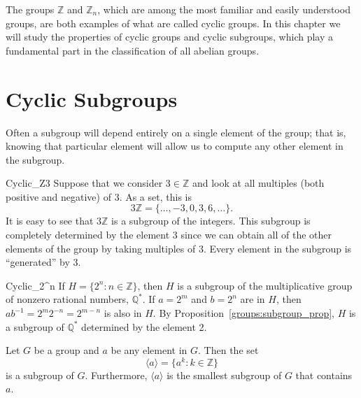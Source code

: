  
The groups $\mathbb Z$ and ${\mathbb Z}_n$, which are among the most familiar and easily understood groups, are both examples of what are called cyclic groups.  In this chapter we will study the properties of cyclic groups and cyclic subgroups, which play a fundamental part in the classification of all abelian groups. 


\section{Cyclic Subgroups}

Often a subgroup will depend entirely on a single element of the group; that is, knowing that particular element will allow us to compute any other element in the subgroup. 

\begin{example}{Cyclic_Z3}
Suppose that we consider $3 \in {\mathbb Z}$ and look at all multiples (both positive and negative) of 3.  As a set, this is 
\[
3 {\mathbb Z} = \{ \ldots, -3, 0, 3, 6, \ldots \}.
\]
It is easy to see that $3 {\mathbb Z}$ is a subgroup of the integers.  This subgroup is completely determined by the element 3 since we can obtain all of the other elements of the group by taking multiples of 3.  Every element in the subgroup is ``generated'' by 3. 
\end{example}

\begin{example}{Cyclic_2^n}
If $H = \{ 2^n : n \in {\mathbb Z} \}$, then $H$ is a subgroup of the multiplicative group of nonzero rational numbers, ${\mathbb Q}^*$.  If $a = 2^m$ and $b = 2^n$ are in $H$, then $ab^{-1} = 2^m 2^{-n} = 2^{m-n}$ is also in $H$.  By Proposition~\ref{groups:subgroup_prop}, $H$ is a subgroup of ${\mathbb Q}^*$ determined by the element 2. 
\end{example}

\begin{theorem}
Let $G$ be a group and $a$ be any element in $G$.  Then the set
\[
\langle a \rangle  = \{ a^k : k \in {\mathbb Z} \}\label{generatedby}
\]
is a subgroup of $G$.  Furthermore, $\langle a \rangle$ is the smallest subgroup of $G$ that contains~$a$. 
\end{theorem}
 

